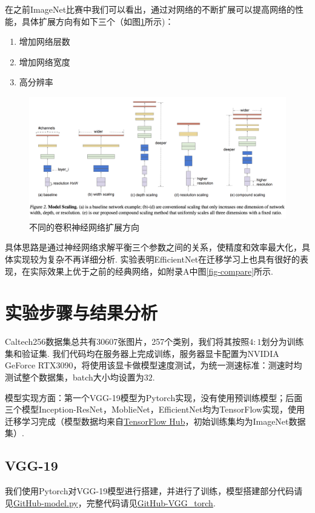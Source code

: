 \documentclass[12pt, a4paper, oneside]{ctexart}
\numberwithin{equation}{section}  %
\begin{document}
在之前ImageNet比赛中我们可以看出，通过对网络的不断扩展可以提高网络的性能，具体扩展方向有如下三个（如图\ref{fig-EfficientNet}所示)：
\begin{enumerate}
  \item 增加网络层数
  \item 增加网络宽度
  \item 高分辨率
\end{enumerate}
\begin{figure}[htbp]
  \vspace*{-1cm}
  \hspace*{-2cm}
  \centering
  \includegraphics[scale=0.4]{EfficientNet.png}
  \caption{不同的卷积神经网络扩展方向}
  \label{fig-EfficientNet}
\end{figure}

具体思路是通过神经网络求解平衡三个参数之间的关系，使精度和效率最大化，具体实现较为复杂不再详细分析. 实验表明EfficientNet在迁移学习上也具有很好的表现，在实际效果上优于之前的经典网络，如附录A中图\ref{fig-compare}所示.\vspace*{-0.5cm}

\section{实验步骤与结果分析}
Caltech256数据集总共有30607张图片，257个类别，我们将其按照$4:1$划分为训练集和验证集. 我们代码均在服务器上完成训练，服务器显卡配置为NVIDIA GeForce RTX3090，将使用该显卡做模型速度测试，为统一测速标准：测速时均测试整个数据集，batch大小均设置为$32$.

模型实现方面：第一个VGG-19模型为Pytorch实现，没有使用预训练模型；后面三个模型Inception-ResNet，MoblieNet，EfficientNet均为TensorFlow实现，使用迁移学习完成（模型数据均来自\href{https://tfhub.dev/}{TensorFlow Hub}，初始训练集均为ImageNet数据集）.

\subsection{VGG-19}
我们使用Pytorch对VGG-19模型进行搭建，并进行了训练，模型搭建部分代码请见\href{https://github.com/wty-yy/LaTex-Projects/blob/main/CVPR/hw4/VGG_torch/model.py}{GitHub-model.py}，完整代码请见\href{https://github.com/wty-yy/LaTex-Projects/tree/main/CVPR/hw4/VGG_torch}{GitHub-VGG\_torch}.
\end{document}
